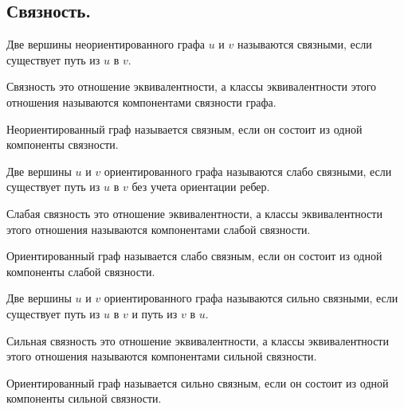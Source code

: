 \subsection{%
  Связность.%
}

\begin{definition}
  Две вершины неориентированного графа \(u\) и \(v\) называются связными, если
  существует путь из \(u\) в \(v\).
\end{definition}

\begin{remark}
  Связность это отношение эквивалентности, а классы эквивалентности этого
  отношения называются компонентами связности графа.
\end{remark}

\begin{definition}
  Неориентированный граф называется связным, если он состоит из одной компоненты
  связности.
\end{definition}

\begin{definition}
  Две вершины \(u\) и \(v\) ориентированного графа называются слабо связными,
  если существует путь из \(u\) в \(v\) без учета ориентации ребер.
\end{definition}

\begin{remark}
  Слабая связность это отношение эквивалентности, а классы эквивалентности этого
  отношения называются компонентами слабой связности.
\end{remark}

\begin{definition}
  Ориентированный граф называется слабо связным, если он состоит из одной
  компоненты слабой связности.
\end{definition}

\begin{definition}
  Две вершины \(u\) и \(v\) ориентированного графа называются сильно связными,
  если существует путь из \(u\) в \(v\) и путь из \(v\) в \(u\).
\end{definition}

\begin{remark}
  Сильная связность это отношение эквивалентности, а классы эквивалентности
  этого отношения называются компонентами сильной связности.
\end{remark}

\begin{definition}
  Ориентированный граф называется сильно связным, если он состоит из одной
  компоненты сильной связности.
\end{definition}

